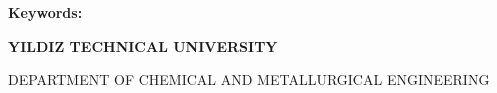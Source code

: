 
\ifnum{}
\ifnum{}
\newpage
\chapter*{\eabstract}

\begin{center}
{\bfseries \Large\titleEN}





\end{center}

\abstractTextEnglish

{\bfseries Keywords:} \abstractKeywordsEnglish

\vfill


\noindent
\rlap{\rule[2.5ex]{\textwidth}{.1pt}}
{\bfseries \small
 \hfill{}YILDIZ TECHNICAL UNIVERSITY\\
 \strut\hfill{}DEPARTMENT OF CHEMICAL AND METALLURGICAL ENGINEERING
 }

\newpage
\chapter*{\tabstract}

\begin{center}
{\bfseries \Large\titleTR}





\end{center}

